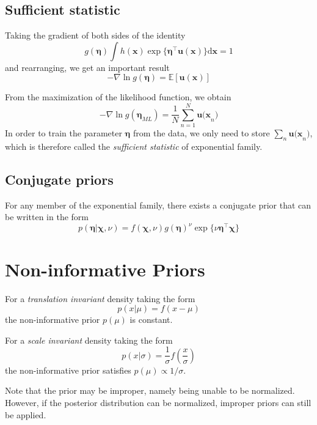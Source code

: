 \documentclass[a4paper]{book}
\newcommand{\ud}{\mathrm{d}}
\renewcommand{\bf}{\mathbf}
\newcommand{\bb}{\mathbb}
\newcommand{\imp}[1]{\textit{#1}}
\begin{document}
\subsection{Sufficient statistic}
Taking the gradient of both sides of the identity
\begin{equation}
	g(\boldsymbol{\eta})\int h(\bf{x})\exp \{ \boldsymbol{\eta}^{\intercal} \bf{u(x)} \} \ud \bf{x} = 1
\end{equation}
and rearranging, we get an important result
\begin{equation}
	-\nabla \ln g(\boldsymbol \eta) = \bb{E}[\bf{u(x)}] \label{Exp}
\end{equation}

From the maximization of the likelihood function, we obtain
\begin{equation}
	-\nabla \ln g(\boldsymbol{\eta}_{ML}) = \frac{1}{N} \sum_{n=1}^{N} \bf{u(x}_n)
\end{equation}
In order to train the parameter $\boldsymbol{\eta}$ from the data, we only need to store $\sum_n \bf{u(x}_n)$, which is therefore called the \imp{sufficient statistic} of exponential family.
\subsection{Conjugate priors}
For any member of the exponential family, there exists a conjugate prior that can be written in the form
\begin{equation}
	p(\boldsymbol{\eta}|\boldsymbol{\chi},\nu)=f(\boldsymbol{\chi},\nu)g(\boldsymbol{\eta})^{\nu}\exp\{\nu \boldsymbol{\eta^{\intercal}\chi}\}
\end{equation}
\section{Non-informative Priors}
For a \imp{translation invariant} density taking the form
\begin{equation}
	p(x|\mu)=f(x-\mu)
\end{equation}
the non-informative prior $p(\mu)$ is constant.

For a \imp{scale invariant} density taking the form
\begin{equation}
	p(x|\sigma)=\frac{1}{\sigma} f(\frac{x}{\sigma})
\end{equation}
the non-informative prior satisfies $p(\mu) \propto 1/\sigma$.

Note that the prior may be improper, namely being unable to be normalized. However, if the posterior distribution can be normalized, improper priors can still be applied.
\end{document}
